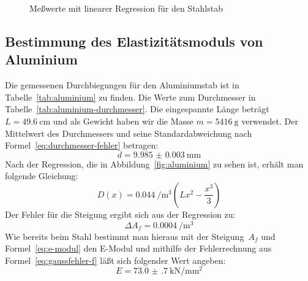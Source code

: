 \begin{figure}
  \centering
  \caption{Meßwerte mit linearer Regression für den Stahlstab}
  \label{fig:stahl}
\end{figure}

\subsection{Bestimmung des Elastizitätsmoduls von Aluminium}

Die gemessenen Durchbiegungen für den Aluminiumstab ist in
Tabelle~\ref{tab:aluminium} zu finden. Die Werte zum Durchmesser in
Tabelle~\ref{tab:aluminium-durchmesser}. Die eingespannte Länge beträgt
$L=\SI{49.6}{\centi\metre}$ und als Gewicht haben wir die Masse
$m=\SI{5416}{\gram}$ verwendet. Der Mittelwert des Durchmessers und
seine Standardabweichung nach Formel~\eqref{eq:durchmesser-fehler} betragen:
%
\begin{equation}
  d = \SI{9.985(3)}{\milli\metre}
\end{equation}
%
Nach der Regression, die in Abbildung~\ref{fig:aluminium} zu sehen ist,
erhält man folgende Gleichung:
%
\begin{equation}
  D(x) = \SI{0.044}{\per\cubic\metre} \left(Lx^2 - \frac{x^3}{3}\right)
\end{equation}
%
Der Fehler für die Steigung ergibt sich aus der Regression zu:
%
\begin{equation}
  \Delta A_f = \SI{0.0004}{\per\cubic\metre}
\end{equation}
%
Wie bereits beim Stahl bestimmt man hieraus mit der Steigung~$A_f$ und
Formel~\eqref{eq:e-modul} den E-Modul und mithilfe der Fehlerrechnung
aus Formel~\eqref{eq:gaussfehler-f} läßt sich folgender Wert angeben:
%
\begin{equation}
  E = \SI{73.0(7)}{\kilo\newton\per\milli\metre\squared}  
\end{equation}

